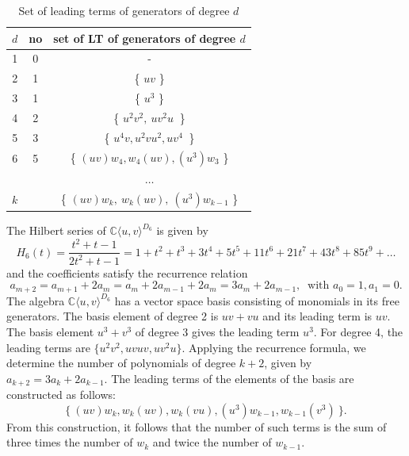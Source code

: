\documentclass{amsart}[12pt]
\theoremstyle{definition}
\begin{document}
\begin{table}[h!]
	\label{T4}
	\centering
	\begin{tabular}{|c|c|c|}
		\hline
		$d$ & no & set of LT of generators of degree $d$ \\
		\hline \hline
		1 & 0 & -\\ [0.2cm]
		\hline
		2 & 1  & \{ $uv$ \} \\ [0.2cm]
		\hline
		3 &  1 & \{ $u^3$ \} \\ [0.2cm]
		\hline
		4 & 2 & \{ $u^2v^2, \ uv^2u\ $ \} \\ [0.2cm]
		\hline
		5 & 3  &\{ $ u^4v,   u^2vu^2,  uv^4\ $ \}\\ [0.2cm]
		\hline
		6 & 5  & \{ $ (uv)w_4, w_4(uv), (u^3)w_3$  \}\\ [0.2cm]
		\hline 	
			& & $\dots$ \\ [0.2cm]
		\hline
		$k $  &  &\{ $ (uv)w_{k}, \ w_{k}(uv),\ (u^3 )w_{k-1}  $ \} \\ [0.2cm]
		\hline 	
	\end{tabular}
\caption{Set of leading terms of generators of degree $d$}
\end{table}

The Hilbert series of ${\mathbb C}\langle u,v\rangle^{D_6}$ is given by
\[
H_6(t)=\frac{t^2+t-1}{2t^2+t-1} = 1 + t^2 + t^3 + 3t^4 + 5t^5 + 11t^6 + 21t^7 + 43t^8 + 85t^9 + \dots
\]
and the coefficients satisfy the recurrence relation
\[
a_{m+2} = a_{m+1} + 2a_m = a_m+2a_{m-1} + 2a_m = 3a_m + 2a_{m-1}, \ \text{ with } a_0=1, a_1=0.
\]
The algebra ${\mathbb C}\langle u,v\rangle^{D_6}$ has a vector space basis consisting of monomials in its free generators.
The basis element of degree 2 is $uv+vu$ and its leading term is $uv$.
The basis element $u^3+v^3$ of degree 3 gives the leading term $u^3$. For degree 4, the leading terms are $\{ u^2v^2, uvuv, uv^2u \}$.
Applying the recurrence formula, we determine the number of polynomials of degree $k+2$, given by $a_{k+2}=3a_{k}+2a_{k-1}$.
The leading terms of the elements of the basis are constructed as follows:
\[
\{ \  (uv)w_{k}, w_{k}(uv), w_{k}(vu), (u^3 )w_{k-1}, w_{k-1}(v^3)  \  \}.
\]
From this construction, it follows that the number of such terms is the sum of three times the number of $w_{k}$ and twice the number of $w_{k-1}$.
\end{document}
